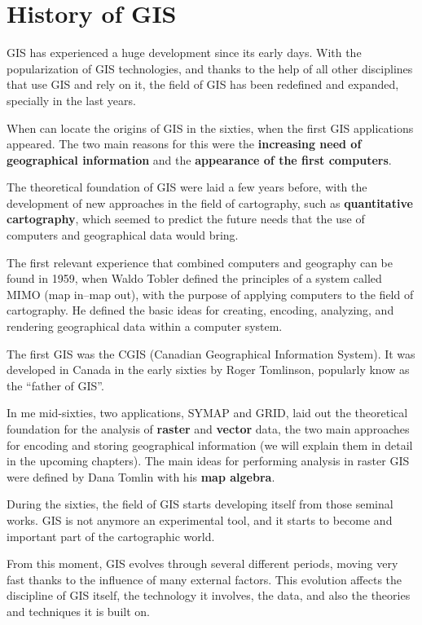 
\chapter{History of GIS}


\pagestyle{fancy}

GIS has experienced a huge development since its early days. With the popularization of GIS technologies, and thanks to the help of all other disciplines that use GIS and rely on it, the field of GIS has been redefined and expanded, specially in the last years.

When can locate the origins of GIS in the sixties, when the first GIS applications appeared. The two main reasons for this were the \textbf{increasing need of geographical information} and the \textbf{appearance of the first computers}.

The theoretical foundation of GIS were laid a few years before, with the development of new approaches in the field of cartography, such as \textbf{quantitative cartography}, which seemed to predict the future needs that the use of computers and geographical data would bring.

The first relevant experience that combined computers and geography can be found in 1959, when Waldo Tobler defined the principles of a system called MIMO (map in--map out), with the purpose of applying computers to the field of cartography. He defined the basic ideas for creating, encoding, analyzing, and rendering geographical data within a computer system.

The first GIS was the CGIS (Canadian Geographical Information System). It was developed in Canada in the early sixties by Roger Tomlinson, popularly know as the ``father of GIS''.

In me mid-sixties, two applications, SYMAP and GRID, laid out the theoretical foundation for the analysis of \textbf{raster} and \textbf{vector} data, the two main approaches for encoding and storing geographical information (we will explain them in detail in the upcoming chapters). The main ideas for performing analysis in raster GIS were defined by Dana Tomlin with his \textbf{map algebra}.

During the sixties, the field of GIS starts developing itself from those seminal works. GIS is not anymore an experimental tool, and it starts to become and important part of the cartographic world.

From this moment, GIS evolves through several different periods, moving very fast thanks to the influence of many external factors. This evolution affects the discipline of GIS itself, the technology it involves, the data, and also the theories and techniques it is built on.



